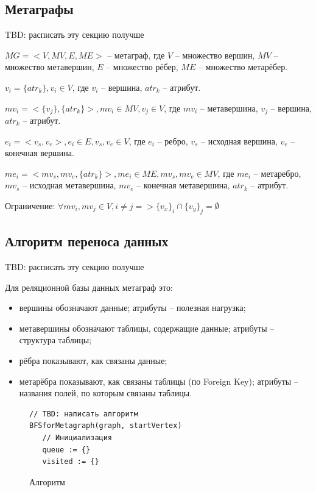 \subsection{Метаграфы}
TBD: расписать эту секцию получше

$MG = <V, MV, E, ME> $ -- метаграф, где $V$ -- множество вершин, $MV$ -- множество метавершин, $E$ -- множество рёбер, $ME$ -- множество метарёбер.

$v_i = \{atr_k\}, v_i \in V$, где $v_i$ -- вершина, $atr_k$ -- атрибут.

$mv_i = <\{v_j\}, \{atr_k\}>, mv_i \in MV, v_j \in V$, где $mv_i$ -- метавершина, $v_j$ -- вершина, $atr_k$ -- атрибут.

$e_i = <v_s, v_e>, e_i \in E, v_s, v_e \in V$, где $e_i$ -- ребро, $v_s$ -- исходная вершина, $v_e$ -- конечная вершина.

$me_i = <mv_s, mv_e, \{atr_k\}>, me_i \in ME, mv_s, mv_e \in MV$, где $me_i$ -- метаребро, $mv_s$ -- исходная метавершина, $mv_e$ -- конечная метавершина, $atr_k$ -- атрибут.

Ограничение: $\forall mv_i, mv_j \in V, i \neq j => \{v_x\}_i \cap \{v_y\}_j = \emptyset$

\subsection{Алгоритм переноса данных}
TBD: расписать эту секцию получше

Для реляционной базы данных метаграф это:
\begin{itemize}
  \item вершины обозначают данные; атрибуты -- полезная нагрузка;
  \item метавершины обозначают таблицы, содержащие данные; атрибуты -- структура таблицы;
  \item рёбра показывают, как связаны данные;
  \item метарёбра показывают, как связаны таблицы (по Foreign Key); атрибуты -- названия полей, по которым связаны таблицы.
\end{itemize}

\begin{figure}
  \fontsize{12pt}{14pt}\selectfont
  \begin{lstlisting}
// TBD: написать алгоритм
BFSforMetagraph(graph, startVertex)
   // Инициализация
   queue := {}
   visited := {}
  \end{lstlisting}
  \caption{Алгоритм }
\end{figure}
